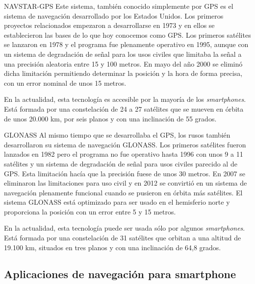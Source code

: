 \begin{definitionlist}
  \item[\acf{NAVSTAR-GPS}] Este sistema, también conocido simplemente por \acs{GPS} es el sistema
    de navegación desarrollado por los Estados Unidos. Los primeros proyectos relacionados empezaron
    a desarrollarse en 1973 y en ellos se establecieron las bases de lo que hoy conocemos como
    \acs{GPS}. Los primeros satélites se lanzaron en 1978 y el programa fue plenamente operativo en
    1995, aunque con un sistema de degradación de señal para los usos civiles que limitaba la señal
    a una precisión aleatoria entre 15 y 100 metros. En mayo del año 2000 se eliminó dicha
    limitación permitiendo determinar la posición y la hora de forma precisa, con un error nominal
    de unos 15 metros.

    En la actualidad, esta tecnología es accesible por la mayoría de los \emph{smartphones}. Está
    formada por una constelación de 24 a 27 satélites que se mueven en órbita de unos 20.000 km, por
    seis planos y con una inclinación de 55 grados.

  \item[GLONASS] Al mismo tiempo que se desarrollaba el \acs{GPS}, los rusos también desarrollaron
    su sistema de navegación \acs{GLONASS}. Los primeros satélites fueron lanzados en 1982 pero el
    programa no fue operativo hasta 1996 con unos 9 a 11 satélites y un sistema de degradación de
    señal para usos civiles parecido al de \acs{GPS}. Esta limitación hacía que la precisión fuese
    de unos 30 metros. En 2007 se eliminaron las limitaciones para uso civil y en 2012 se convirtió
    en un sistema de navegación plenamente funcional cuando se pusieron en órbita más satélites. El
    sistema \acs{GLONASS} está optimizado para ser usado en el hemisferio norte y proporciona la
    posición con un error entre 5 y 15 metros.

    En la actualidad, esta tecnología puede ser usada sólo por algunos \emph{smartphones}. Está
    formada por una constelación de 31 satélites que orbitan a una altitud de 19.100 km, situados en
    tres planos y con una inclinación de 64,8 grados.

\end{definitionlist}


\subsection{Aplicaciones de navegación para smartphone}
\label{sec:apps}

